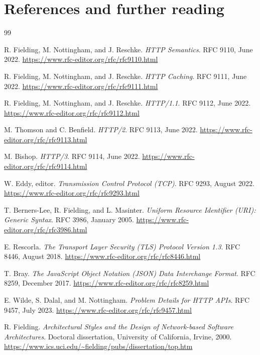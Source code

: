 \chapter*{References and further reading}

\begin{thebibliography}{99}

R. Fielding, M. Nottingham, and J. Reschke.
\emph{HTTP Semantics}. RFC 9110, June 2022.
\url{https://www.rfc-editor.org/rfc/rfc9110.html}

R. Fielding, M. Nottingham, and J. Reschke.
\emph{HTTP Caching}. RFC 9111, June 2022.
\url{https://www.rfc-editor.org/rfc/rfc9111.html}

R. Fielding, M. Nottingham, and J. Reschke.
\emph{HTTP/1.1}. RFC 9112, June 2022.
\url{https://www.rfc-editor.org/rfc/rfc9112.html}

M. Thomson and C. Benfield.
\emph{HTTP/2}. RFC 9113, June 2022.
\url{https://www.rfc-editor.org/rfc/rfc9113.html}

M. Bishop.
\emph{HTTP/3}. RFC 9114, June 2022.
\url{https://www.rfc-editor.org/rfc/rfc9114.html}

W. Eddy, editor.
\emph{Transmission Control Protocol (TCP)}. RFC 9293, August 2022.
\url{https://www.rfc-editor.org/rfc/rfc9293.html}

T. Berners-Lee, R. Fielding, and L. Masinter.
\emph{Uniform Resource Identifier (URI): Generic Syntax}. RFC 3986, January 2005.
\url{https://www.rfc-editor.org/rfc/rfc3986.html}

E. Rescorla.
\emph{The Transport Layer Security (TLS) Protocol Version 1.3}. RFC 8446, August 2018.
\url{https://www.rfc-editor.org/rfc/rfc8446.html}

T. Bray.
\emph{The JavaScript Object Notation (JSON) Data Interchange Format}. RFC 8259, December 2017.
\url{https://www.rfc-editor.org/rfc/rfc8259.html}

E. Wilde, S. Dalal, and M. Nottingham.
\emph{Problem Details for HTTP APIs}. RFC 9457, July 2023.
\url{https://www.rfc-editor.org/rfc/rfc9457.html}

R. Fielding.
\emph{Architectural Styles and the Design of Network-based Software Architectures}.
Doctoral dissertation, University of California, Irvine, 2000.
\url{https://www.ics.uci.edu/~fielding/pubs/dissertation/top.htm}


\end{thebibliography}
